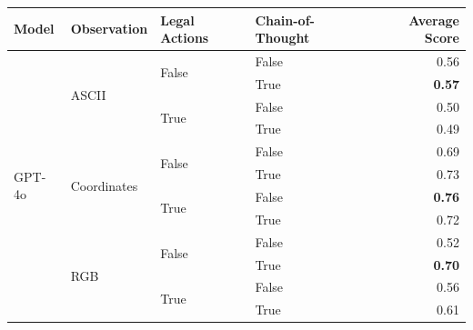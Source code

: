 \begin{tabular}{@{}llllr@{}}
    \toprule
    \textbf{Model}                  & \textbf{Observation}              & \textbf{Legal Actions}    & \textbf{Chain-of-Thought} & \textbf{Average Score} \\
    \midrule            
    \multirow[c]{13}{*}{GPT-4o}     & \multirow[c]{4}{*}{ASCII}         & \multirow[c]{2}{*}{False} & False                     & 0.56 \\
                                    &                                   &                           & True                      & \textbf{0.57} \\
                                    &                                   & \multirow[c]{2}{*}{True}  & False                     & 0.50 \\
                                    &                                   &                           & True                      & 0.49 \\
    \cmidrule{2-5}                                                                                                                 
                                    & \multirow[c]{4}{*}{Coordinates}   & \multirow[c]{2}{*}{False} & False                     & 0.69 \\
                                    &                                   &                           & True                      & 0.73 \\
                                    &                                   & \multirow[c]{2}{*}{True}  & False                     & \textbf{0.76} \\
                                    &                                   &                           & True                      & 0.72 \\
    \cmidrule{2-5}                                                                                                                 
                                    & \multirow[c]{4}{*}{RGB}           & \multirow[c]{2}{*}{False} & False                     & 0.52 \\
                                    &                                   &                           & True                      & \textbf{0.70} \\
                                    &                                   & \multirow[c]{2}{*}{True}  & False                     & 0.56 \\
                                    &                                   &                           & True                      & 0.61 \\

\end{tabular}
